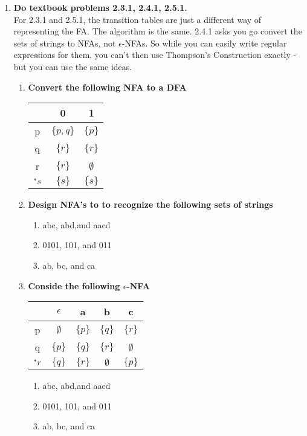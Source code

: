 \begin{enumerate}
\newpage
\item \textbf{Do textbook problems 2.3.1, 2.4.1, 2.5.1.}
\\ For 2.3.1 and 2.5.1, the transition tables are just a different way of representing the FA. The algorithm is the same.
2.4.1 asks you go convert the sets of strings to NFAs, not $\epsilon$-NFAs. So while you can easily write regular expressions for them, you can't then use Thompson's Construction exactly -  but you can use the same ideas.
\begin{enumerate}
	\item \textbf{Convert the following NFA to a DFA}
	\begin{table}[]
		\begin{tabular}{c||c|c}
			 &  0 &  1   \\ \hline
			p& $\{p,q\}$ &  $\{p\}$   \\ \hline
			q&  $\{r\}$& $\{r\}$   \\ \hline
			r&  $\{r\}$& $\emptyset$   \\ \hline
			${}^\ast s$& $\{s\}$ & $\{s\}$ \\ \hline
		\end{tabular}
	\end{table}

	\item \textbf{Design NFA's to to recognize the following sets of strings}
		\begin{enumerate}
			\item abc, abd,and aacd 
			\item 0101, 101, and 011
			\item ab, bc, and ca 
		\end{enumerate}

	\item \textbf{Conside the following $\epsilon$-NFA}
	
		\begin{table}[]
		\begin{tabular}{c||c|c|c|c}
			&  $\epsilon$ &  a   & b & c\\ \hline
			p&  $\emptyset$ &  $\{p\}$  & $\{q\}$& $\{r\}$ \\ \hline
			q&  $\{p\}$& $\{q\}$   & $\{r\}$ &  $\emptyset$\\ \hline
			${}^\ast r$&  $\{q\}$& $\{r\}$ &  $\emptyset$ & $\{p\}$ \\ \hline
		\end{tabular}
	\end{table}

			\begin{enumerate}
		\item abc, abd,and aacd 
		\item 0101, 101, and 011
		\item ab, bc, and ca 
	\end{enumerate}
\end{enumerate}

\end{enumerate}


